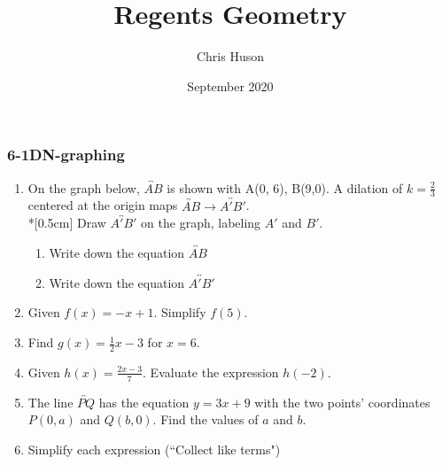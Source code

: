 \documentclass[12pt, twoside]{article}
\title{Regents Geometry}
\author{Chris Huson}
\date{September 2020}
\begin{document}
\subsubsection*{6-1DN-graphing}
\begin{enumerate}
\item On the graph below, $\overleftrightarrow{AB}$ is shown with A(0, 6), B(9,0). A dilation of $k=\frac{2}{3}$ centered at the origin maps $\overleftrightarrow{AB} \rightarrow \overleftrightarrow{A'B'}$.\\*[0.5cm]
  Draw $\overleftrightarrow{A'B'}$ on the graph, labeling $A'$ and $B'$.
    \begin{center}
    \end{center}
      \vspace{1cm}
    \begin{enumerate}
      \item Write down the equation $\overleftrightarrow{AB}$ \vspace{2cm}
      \item Write down the equation $\overleftrightarrow{A'B'}$
    \end{enumerate}
    
\newpage

\item Given $f(x)=-x+1$. Simplify $f(5)$. \vspace{2cm}
\item Find $g(x)=\frac{1}{2} x-3$ for $x=6$. \vspace{2.5cm}
\item Given $\displaystyle h(x)=\frac{2x-3}{7}$. Evaluate the expression $h(-2)$. \vspace{3cm}

\item The line $\overleftrightarrow{PQ}$ has the equation $y=3x+9$ with the two points' coordinates $P(0,a)$ and $Q(b,0)$. Find the values of $a$ and $b$. \vspace{5cm}

\item Simplify each expression (``Collect like terms")
  \begin{enumerate}
  \end{enumerate}
  

\end{enumerate}
\end{document}
